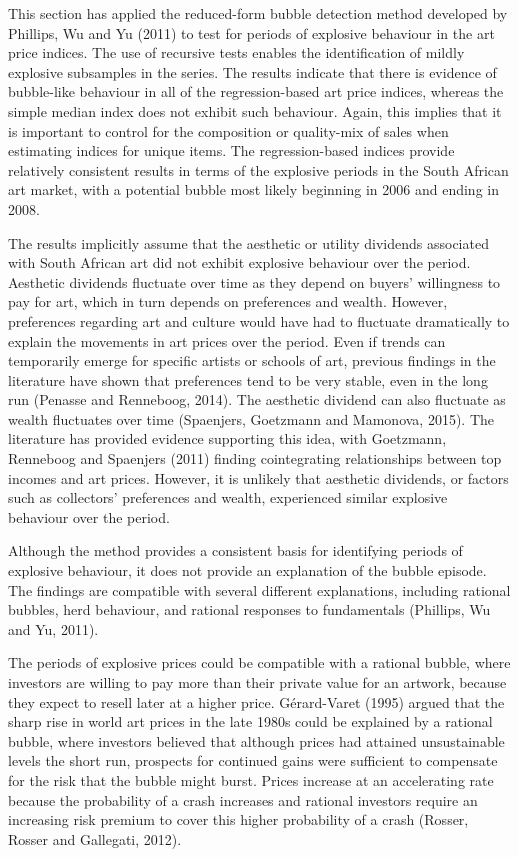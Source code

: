 \documentclass[12pt,]{article}
\begin{document}
This section has applied the reduced-form bubble detection method
developed by Phillips, Wu and Yu (2011) to test for periods of explosive
behaviour in the art price indices. The use of recursive tests enables
the identification of mildly explosive subsamples in the series. The
results indicate that there is evidence of bubble-like behaviour in all
of the regression-based art price indices, whereas the simple median
index does not exhibit such behaviour. Again, this implies that it is
important to control for the composition or quality-mix of sales when
estimating indices for unique items. The regression-based indices
provide relatively consistent results in terms of the explosive periods
in the South African art market, with a potential bubble most likely
beginning in 2006 and ending in 2008.

The results implicitly assume that the aesthetic or utility dividends
associated with South African art did not exhibit explosive behaviour
over the period. Aesthetic dividends fluctuate over time as they depend
on buyers' willingness to pay for art, which in turn depends on
preferences and wealth. However, preferences regarding art and culture
would have had to fluctuate dramatically to explain the movements in art
prices over the period. Even if trends can temporarily emerge for
specific artists or schools of art, previous findings in the literature
have shown that preferences tend to be very stable, even in the long run
(Penasse and Renneboog, 2014). The aesthetic dividend can also fluctuate
as wealth fluctuates over time (Spaenjers, Goetzmann and Mamonova,
2015). The literature has provided evidence supporting this idea, with
Goetzmann, Renneboog and Spaenjers (2011) finding cointegrating
relationships between top incomes and art prices. However, it is
unlikely that aesthetic dividends, or factors such as collectors'
preferences and wealth, experienced similar explosive behaviour over the
period.

Although the method provides a consistent basis for identifying periods
of explosive behaviour, it does not provide an explanation of the bubble
episode. The findings are compatible with several different
explanations, including rational bubbles, herd behaviour, and rational
responses to fundamentals (Phillips, Wu and Yu, 2011).

The periods of explosive prices could be compatible with a rational
bubble, where investors are willing to pay more than their private value
for an artwork, because they expect to resell later at a higher price.
Gérard-Varet (1995) argued that the sharp rise in world art prices in
the late 1980s could be explained by a rational bubble, where investors
believed that although prices had attained unsustainable levels the
short run, prospects for continued gains were sufficient to compensate
for the risk that the bubble might burst. Prices increase at an
accelerating rate because the probability of a crash increases and
rational investors require an increasing risk premium to cover this
higher probability of a crash (Rosser, Rosser and Gallegati, 2012).
\end{document}
